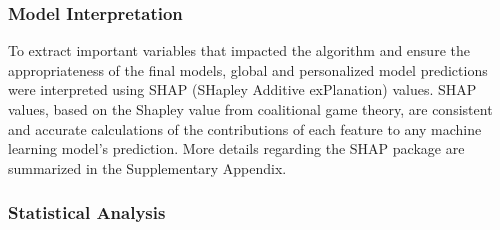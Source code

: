 \subsubsection{Model Interpretation}
To extract important variables that impacted the algorithm 
and ensure the appropriateness of the final models, 
global and personalized model predictions were interpreted 
using SHAP (SHapley Additive exPlanation) values.\supercite{lundberg2017unified}
SHAP values, based on the Shapley value from coalitional game theory, 
are consistent and accurate calculations of the contributions of each feature to any machine learning model’s prediction. 
More details regarding the SHAP package are summarized in the Supplementary Appendix.

\subsubsection{Statistical Analysis}

